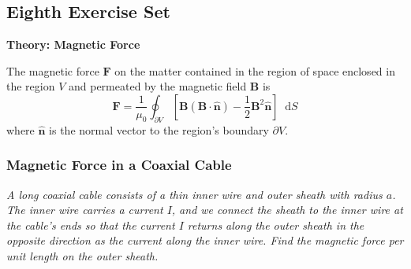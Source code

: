 \documentclass[11pt, a4paper]{article}
\newcommand{\diff}{\mathop{}\!\mathrm{d}} %
\renewcommand{\vec}[1]{\bm{#1}} %
\newcommand{\uvec}[1]{\hat{\vec{#1}}} %
\newcommand{\B}{\vec{B}}  %
\begin{document}
\begin{itemize}
\end{itemize}

\subsection{Eighth Exercise Set}

\textbf{Theory: Magnetic Force}\vspace{2mm}

The magnetic force $ \vec{F} $ on the matter contained in the region of space enclosed in the region $ V $ and permeated by the magnetic field $ \B $ is
\begin{equation*}
	\vec{F} = \frac{1}{\mu_{0}}\oint_{\partial V}\left [\B(\B \cdot \uvec{n}) - \frac{1}{2}\B^{2}\uvec{n}\right ] \diff S
\end{equation*}
where $ \uvec{n} $ is the normal vector to the region's boundary $ \partial V $.

\subsubsection{Magnetic Force in a Coaxial Cable}
\textit{A long coaxial cable consists of a thin inner wire and outer sheath with radius $ a $. The inner wire carries a current $ I $, and we connect the sheath to the inner wire at the cable's ends so that the current $ I $ returns along the outer sheath in the opposite direction as the current along the inner wire. Find the magnetic force per unit length on the outer sheath.}
\end{document}
